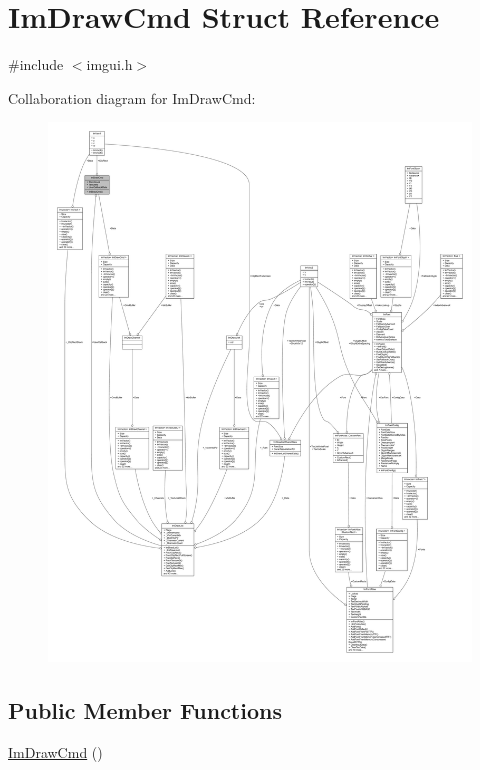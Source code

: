 \hypertarget{struct_im_draw_cmd}{}\section{Im\+Draw\+Cmd Struct Reference}
\label{struct_im_draw_cmd}


{\ttfamily \#include $<$imgui.\+h$>$}



Collaboration diagram for Im\+Draw\+Cmd\+:
\nopagebreak
\begin{figure}[H]
\begin{center}
\leavevmode
\includegraphics[width=350pt]{struct_im_draw_cmd__coll__graph}
\end{center}
\end{figure}
\subsection*{Public Member Functions}
\begin{DoxyCompactItemize}
\item 
\mbox{\hyperlink{struct_im_draw_cmd_adcf30cacb8e6b747e90000603c87f1e3}{Im\+Draw\+Cmd}} ()
\end{DoxyCompactItemize}

